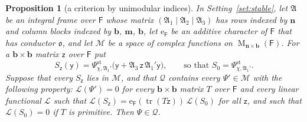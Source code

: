 \documentclass[11pt,a4paper]{article}
\theoremstyle{plainx}
\newtheorem{proposition}[theorem]{Proposition}
\theoremstyle{uprightx}
\newcommand{\dS}{\Psi}                 %
\newcommand{\sF}{\mathsf{F}}
\newcommand{\sO}{\mathfrak{o}}
\newcommand{\bb}{\mathbf{b}}
\newcommand{\bm}{\mathbf{m}}
\newcommand{\bn}{\mathbf{n}}
\newcommand{\sy}{\mathsf{y}}
\newcommand{\sz}{\mathsf{z}}
\newcommand{\fA}{\mathfrak{A}}
\newcommand{\tr}{\operatorname{tr}}
\newcommand{\cM}{\mathcal{M}}
\newcommand{\cL}{\mathcal{L}}
\newcommand{\cP}{\mathcal{Q}}
\newcommand{\Mat}[2]{\operatorname{M}_{#1\times#2}}
\newcommand{\stc}[2]{\dS^{\mathrm{st}}_{#1,#2}}
\begin{document}
\begin{proposition}[a criterion by unimodular indices]\label{p:unimod}
In Setting~\ref{set:stable}, let $\fA$ be an integral frame over $\sF$ whose matrix $(\fA_1\mid\fA_2\mid\fA_3)$ has rows
indexed by $\bn$ and column blocks indexed by $\bb$, $\bm$, $\bb$, let $\mathrm{e}_{\sF}$ be an additive character
of $\sF$ that has conductor $\sO$, and let $\cM$ be a space of complex functions on $\Mat{\bn}{\bb}(\sF)$. For a
$\bb\times\bb$ matrix $\sz$ over $\sF$ put
\[S_{\sz}(\sy)=\stc{\chi}{\fA_1'}\bigl(\sy+\fA_3\,\sz\,\fA_1'\sy\bigr),\qquad\text{so that }S_0=\stc{\chi}{\fA_1'}.\]
Suppose that every $S_{\sz}$ lies in $\cM$, and that $\cP$ contains every $\dS'\in\cM$ with the following property:
$\cL(\dS')=0$ for every $\bb\times\bb$ matrix $T$ over $\sF$ and every linear functional $\cL$ such that
$\cL(S_{\sz})=\mathrm{e}_{\sF}(\tr(T\sz))\,\cL(S_0)$ for all $\sz$, and such that $\cL(S_0)=0$ if $T$ is primitive.
Then $\dS\in\cP$.
\end{proposition}
\end{document}
